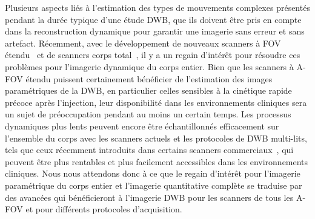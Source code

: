 Plusieurs aspects liés à l'estimation des types de mouvements complexes présentés pendant la durée typique d'une étude DWB, que ils doivent être pris en compte dans la reconstruction dynamique pour garantir une imagerie sans erreur et sans artefact.
Récemment, avec le développement de nouveaux scanners à FOV étendu~\cite{Karp2020,Siegel2020} et de scanners corps total~\cite{Cherry2018}, il y a un regain d'intérêt pour résoudre ces problèmes pour l'imagerie dynamique du corps entier. 
Bien que les scanners à A-FOV étendu puissent certainement bénéficier de l'estimation des images paramétriques de la DWB, en particulier celles sensibles à la cinétique rapide précoce après l'injection, leur disponibilité dans les environnements cliniques sera un sujet de préoccupation pendant au moins un certain temps. Les processus dynamiques plus lents peuvent encore être échantillonnés efficacement sur l'ensemble du corps avec les scanners actuels et les protocoles de DWB multi-lits, tels que ceux récemment introduits dans certains scanners commerciaux~\cite{Hu2020}, qui peuvent être plus rentables et plus facilement accessibles dans les environnements cliniques.
Nous nous attendons donc à ce que le regain d'intérêt pour l'imagerie paramétrique du corps entier et l'imagerie quantitative complète se traduise par des avancées qui bénéficieront à l'imagerie DWB pour les scanners de tous les A-FOV et pour différents protocoles d'acquisition. 
